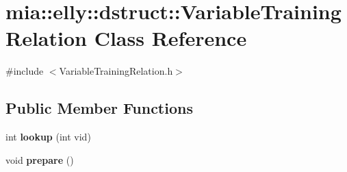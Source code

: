 \hypertarget{classmia_1_1elly_1_1dstruct_1_1_variable_training_relation}{\section{mia\-:\-:elly\-:\-:dstruct\-:\-:Variable\-Training\-Relation Class Reference}
\label{classmia_1_1elly_1_1dstruct_1_1_variable_training_relation}
}


{\ttfamily \#include $<$Variable\-Training\-Relation.\-h$>$}

\subsection*{Public Member Functions}
\begin{DoxyCompactItemize}
\item 
\hypertarget{classmia_1_1elly_1_1dstruct_1_1_variable_training_relation_a9cb4f20019182911637db8a593a85fbd}{int {\bfseries lookup} (int vid)}\label{classmia_1_1elly_1_1dstruct_1_1_variable_training_relation_a9cb4f20019182911637db8a593a85fbd}

\item 
\hypertarget{classmia_1_1elly_1_1dstruct_1_1_variable_training_relation_ac77cbc07585f81a6e02a49bb56baeba7}{void {\bfseries prepare} ()}\label{classmia_1_1elly_1_1dstruct_1_1_variable_training_relation_ac77cbc07585f81a6e02a49bb56baeba7}

\end{DoxyCompactItemize}
